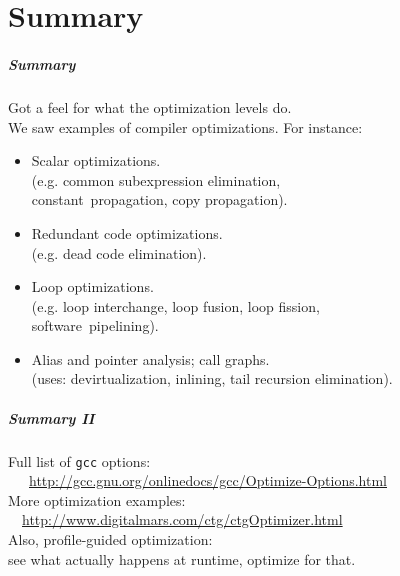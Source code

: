 \part{Summary}
\frame{\partpage}

\begin{frame}
  \frametitle{Summary}

  
    Got a feel for what the optimization levels do.\\
    We saw examples of compiler optimizations. For instance:
\begin{itemize}
\item Scalar optimizations. \\
(e.g. common subexpression elimination,\\ \quad constant~propagation, copy propagation).
\item Redundant code optimizations.\\
(e.g. dead code elimination).
\item Loop optimizations.\\
(e.g. loop interchange, loop fusion, loop fission, \\ \quad software~pipelining).
\item Alias and pointer analysis; call graphs.\\
(uses: devirtualization, inlining, tail recursion elimination).
\end{itemize}
  


\end{frame}

\begin{frame}
  \frametitle{Summary II}

  
     Full list of {\tt gcc} options: \\ ~~~{\small \url{http://gcc.gnu.org/onlinedocs/gcc/Optimize-Options.html}}\\
      More optimization examples: \\ ~~\url{http://www.digitalmars.com/ctg/ctgOptimizer.html}\\[1em]
  
  

     Also, profile-guided optimization:\\
\qquad see what actually happens at runtime, optimize for that.
  
\end{frame}


